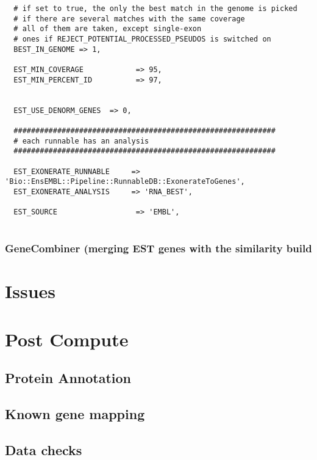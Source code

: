 \documentclass[a4paper,10pt]{article}
\begin{document}
\begin{verbatim}
  # if set to true, the only the best match in the genome is picked
  # if there are several matches with the same coverage
  # all of them are taken, except single-exon 
  # ones if REJECT_POTENTIAL_PROCESSED_PSEUDOS is switched on 
  BEST_IN_GENOME => 1,
  
  EST_MIN_COVERAGE            => 95,
  EST_MIN_PERCENT_ID          => 97,
  

  EST_USE_DENORM_GENES	=> 0,
  
  ############################################################
  # each runnable has an analysis
  ############################################################
  
  EST_EXONERATE_RUNNABLE     => 'Bio::EnsEMBL::Pipeline::RunnableDB::ExonerateToGenes',      
  EST_EXONERATE_ANALYSIS     => 'RNA_BEST',
  
  EST_SOURCE                  => 'EMBL',      
  
\end{verbatim}

\subsubsection{GeneCombiner (merging EST genes with the similarity build}

\section{Issues}

\section{Post Compute}
\subsection{Protein Annotation}
\subsection{Known gene mapping}
\subsection{Data checks}
\end{document}
